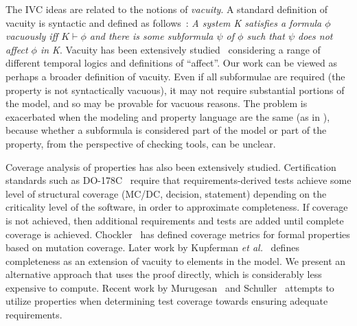 The IVC ideas are related to the notions of {\em vacuity}.  A standard definition of vacuity is syntactic and defined as follows~\cite{Kupferman:2006:SCF}: {\em A system K satisfies a formula $\phi$ vacuously iff $K \vdash \phi$ and there is some subformula $\psi$ of $\phi$ such that $\psi$ does not affect $\phi$ in K}.  Vacuity has been extensively studied~\cite{Gurfinkel:2012:RVB,Chockler2008,DBLP:Ben-DavidK13,Kupferman:2006:SCF,Chockler:2007,Beer1997} considering a range of different temporal logics and definitions of ``affect''.  
Our work can be viewed as perhaps a broader definition of vacuity.  Even if all subformulae are required (the property is not syntactically vacuous), it may not require substantial portions of the model, and so may be provable for vacuous reasons.  The problem is exacerbated when the modeling and property language are the same (as in \jkind), because whether a subformula is considered part of the model or part of the property, from the perspective of checking tools, can be unclear.


Coverage analysis of properties has also been extensively studied. Certification standards such as DO-178C~\cite{DO178C} require that requirements-derived tests achieve some level of structural coverage (MC/DC, decision, statement) depending on the criticality level of the software, in order to approximate completeness.  If coverage is not achieved, then additional requirements and tests are added until complete coverage is achieved.  Chockler~\cite{chockler_coverage_2003,chockler2001practical,chockler2010coverage} has defined coverage metrics for formal properties based on mutation coverage.  Later work by Kupferman \textit{et al.}~\cite{Kupferman:2006:SCF,kupferman_theory_2008} defines completeness as an extension of vacuity to elements in the model.  We present an alternative approach that uses the proof directly, which is considerably less expensive to compute.  Recent work by Murugesan~\cite{murugesan2015we} and Schuller~\cite{schuler_assessing_2011} attempts to utilize properties when determining test coverage towards ensuring adequate requirements.




\iffalse
\begin{itemize}
    \item MUS's : checked
    \item Work on Alloy: checked
    \item Work that Teme pointed us to : will be added
    \item Anything else Elaheh has found : \%60 checked
\end{itemize}
\fi


